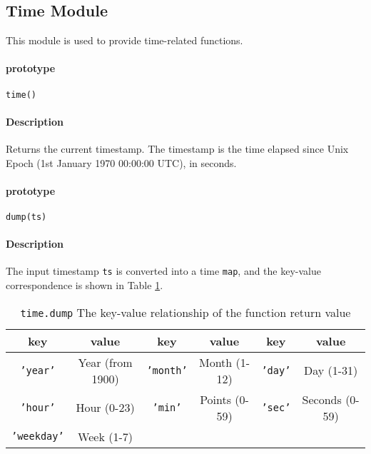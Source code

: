 \subsection {Time Module}

This module is used to provide time-related functions.

\paragraph{prototype}
\begin{lstlisting}[language=berry, numbers=none]
time()
\end{lstlisting}

\paragraph{Description}
Returns the current timestamp. The timestamp is the time elapsed since Unix Epoch (1st January 1970 00:00:00 UTC), in seconds.


\paragraph{prototype}
\begin{lstlisting}[language=berry, numbers=none]
dump(ts)
\end{lstlisting}

\paragraph{Description}
The input timestamp \texttt{ts} is converted into a time \texttt{map}, and the key-value correspondence is shown in Table \ref{tab::time_dump_map}.
\begin{table}[htb]
    \centering
    \setlength{\tabcolsep}{2mm}
    \begin{tabular}{cccccc} \toprule
        \textbf{key} & \textbf{value} & \textbf{key} & \textbf{value} & \textbf{key} & \textbf{value} \\ \midrule
        \texttt{'year'} & Year (from 1900) & \texttt{'month'} & Month (1-12) & \texttt{'day'} & Day (1-31) \\
        \texttt{'hour'} & Hour (0-23) & \texttt{'min'} & Points (0-59) & \texttt{'sec'} & Seconds (0-59) \\
        \texttt{'weekday'} & Week (1-7) \\
        \bottomrule
    \end{tabular}
    \caption{\texttt{time.dump} The key-value relationship of the function return value}
    \label{tab::time_dump_map}
\end{table}

